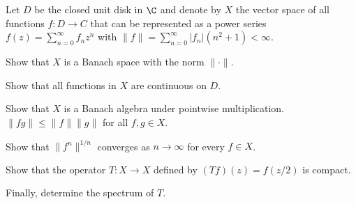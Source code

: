 Let $D$ be the closed unit disk in $\C$ and denote by $X$ the vector
space of all functions $f:D\rightarrow C$ that can be represented as a
power series $f(z)=\sum_{n=0}^{\infty}f_nz^n$ with
$\|f\|=\sum_{n=0}^{\infty}|f_n|(n^2+1)<\infty$.

\begin{alist}
\item Show that $X$ is a Banach space with the norm $\|\cdot\|$.
\item Show that all functions in $X$ are continuous on $D$.
\item Show that $X$ is a Banach algebra under pointwise multiplication. 
\Ie\ $\|fg\|\leq \|f\|\|g\|$ for all $f,g\in X$.
\item Show that $\|f^n\|^{1/n}$ converges as $n\rightarrow \infty$ for 
every $f\in X$.
\item Show that the operator $T:X\rightarrow X$ defined by 
$(Tf)(z)=f(z/2)$ is compact.
\item Finally, determine the spectrum of $T$.
\end{alist}
